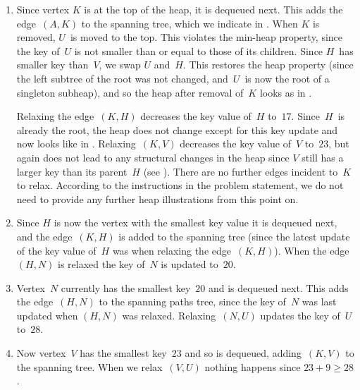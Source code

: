 \documentclass{jn-pset}
\begin{document}
\begin{problem}
\begin{solution}
\begin{enumerate}
  \item 
    Since vertex $K$ is at the top of the heap, it is dequeued
    next. This adds the edge~$(A,K)$ to the spanning tree,
    which we indicate in
    .
    When $K$ is removed, $U$~is moved to the top. This violates the
    min-heap property, since the key of~$U$ 
    is not smaller than or equal to those of its
    children.  Since $H$~has smaller key than~$V$, we swap $U$
    and~$H$. This restores the heap property
    (since the left subtree of the root was not changed, and~$U$~is
    now the root of a singleton subheap), and so the
    heap after removal of~$K$
    looks as in 
    .    

    
        
    Relaxing the edge~$(K, H)$ decreases the key value of~$H$ to~$17$.
    Since~$H$~is already the root, the heap does not
    change except for this key update and now looks like in
    .    
    Relaxing~$(K, V)$  decreases the key value of~$V$ to~$23$,
    but again does not lead to any structural changes in the heap
    since $V$ still has a larger key than its parent~$H$
    (see ).
    There are no further edges incident to~$K$ to relax.
    According to the instructions in the problem statement, we do not
    need to provide any further heap illustrations from this point on.
    

  \item
    Since $H$ is now the vertex with the smallest key value it is dequeued next,
    and the edge~$(K, H)$ is added to the spanning tree
    (since the latest update of the key value of~$H$ was when relaxing
    the edge~$(K, H)$).
    When the edge $(H, N)$ is relaxed the key of~$N$ is updated to~$20$.

  \item
    Vertex~$N$ currently has the smallest key~$20$ and is dequeued next.
    This adds the edge~$(H, N)$ to the spanning paths tree, since
    the key of~$N$ was last updated when $(H, N)$ was relaxed.
    Relaxing~$(N,U)$
    updates the key of~$U$ to~$28$.

  \item
    Now vertex~$V$ has the smallest key~$23$ and so is dequeued,
    adding~$(K, V)$ to the spanning tree.
    When we relax~$(V,U)$
    nothing happens since $23 + 9 \geq 28$.


\end{enumerate}
\end{solution}
\end{problem}
\end{document}
